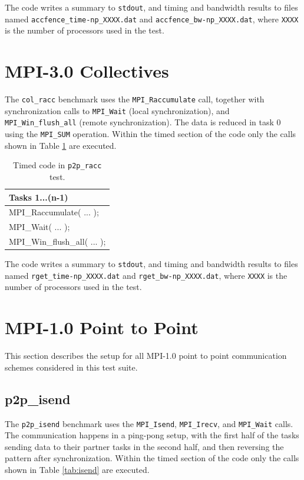 \documentclass[10pt,a4paper]{report}
\begin{document}
The code writes a summary to \verb+stdout+, and timing and bandwidth results to files named \verb+accfence_time-np_XXXX.dat+ and \verb+accfence_bw-np_XXXX.dat+, where \verb+XXXX+ is the number of processors used in the test.

\section{MPI-3.0 Collectives}
The \verb+col_racc+ benchmark uses the \verb+MPI_Raccumulate+ call, together with synchronization calls to \verb+MPI_Wait+ (local synchronization), and \verb+MPI_Win_flush_all+ (remote synchronization). The data is reduced in task 0 using the \verb+MPI_SUM+ operation. Within the timed section of the code only the calls shown in Table \ref{tab:racc} are executed.

\begin{table}[ht]
\centering
\caption{Timed code in \texttt{p2p\_racc} test.}
\label{tab:racc}
\begin{tabular}{|l|}
\hline
\bf{Tasks 1...(n-1)}	   \\\hline
MPI\_Raccumulate( ... );           \\
MPI\_Wait( ... );           \\
MPI\_Win\_flush\_all( ... );\\\hline
\end{tabular}
\end{table}

The code writes a summary to \verb+stdout+, and timing and bandwidth results to files named \verb+rget_time-np_XXXX.dat+ and \verb+rget_bw-np_XXXX.dat+, where \verb+XXXX+ is the number of processors used in the test.

\section{MPI-1.0 Point to Point}
This section describes the setup for all MPI-1.0 point to point communication schemes considered in this test suite.

\subsection{p2p\_isend}
The \verb+p2p_isend+ benchmark uses the \verb+MPI_Isend+, \verb+MPI_Irecv+, and \verb+MPI_Wait+ calls. The communication happens in a ping-pong setup, with the first half of the tasks sending data to their partner tasks in the second half, and then reversing the pattern after synchronization. Within the timed section of the code only the calls shown in Table \ref{tab:isend} are executed.
\end{document}
